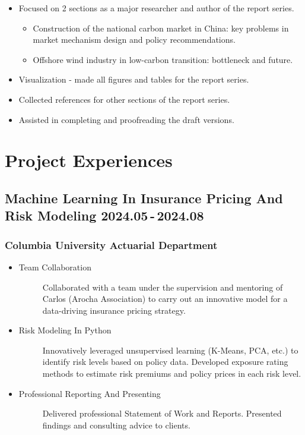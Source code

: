 \documentclass[a4paper]{article}
\begin{document}
\begin{itemize}
    \item Focused on 2 sections as a major researcher and author of the report series.
    \begin{itemize}
        \item Construction of the national carbon market in China: key problems in market mechanism design and policy recommendations.
        \item Offshore wind industry in low-carbon transition: bottleneck and future.
    \end{itemize}
    \item Visualization - made all figures and tables for the report series. 
    \item Collected references for other sections of the report series. 
    \item Assisted in completing and proofreading the draft versions.
\end{itemize}

\hypertarget{project-exp}{
    \section{Project Experiences}
}
\hypertarget{integrated}{
    \subsection{Machine Learning In Insurance Pricing And Risk Modeling \normalfont \hfill 2024.05\,-\,2024.08} 
}

\subsubsection{Columbia University Actuarial Department} 
\vspace{3pt}
\begin{itemize}
    \item\begin{description}
        \item[Team Collaboration] Collaborated with a team under the supervision and mentoring of Carlos (Arocha Association) to carry out an innovative model for a data-driving insurance pricing strategy.
    \end{description}
    \item\begin{description}
        \item[Risk Modeling In Python] Innovatively leveraged unsupervised learning (K-Means, PCA, etc.) to identify risk levels based on policy data. Developed exposure rating methods to estimate risk premiums and policy prices in each risk level.
    \end{description}
    \item\begin{description}
        \item[Professional Reporting And Presenting] Delivered professional Statement of Work and Reports. Presented findings and consulting advice to clients.
    \end{description}
\end{itemize} 
\end{document}
